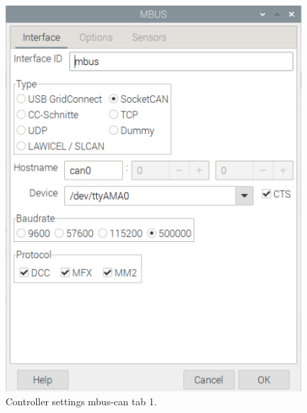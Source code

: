 \begin{figure}[h!]
	\centering
	\includegraphics[width=1.00\linewidth]{../figures/rocrailcontrollersettings/mbus_settings_tab1.png}
	\caption{Controller settings mbus-can tab 1.}
	\label{fig:mbus_settings_tab1}
\end{figure}

